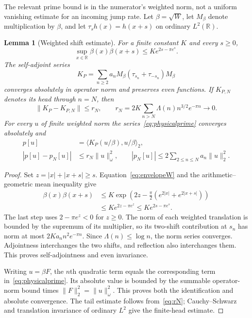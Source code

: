 \documentclass[11pt,a4paper]{article}
\numberwithin{equation}{section}
\newtheorem{lemma}[theorem]{Lemma}
\theoremstyle{definition}
\theoremstyle{remark}
\newcommand{\R}{\mathbb R}
\newcommand{\ip}[2]{\langle #1,#2\rangle}
\newcommand{\norm}[1]{\lVert #1\rVert}
\begin{document}
The relevant prime bound is in the numerator's weighted norm, not a uniform vanishing estimate for an incoming jump rate. Let $\beta=\sqrt W$, let $M_\beta$ denote multiplication by $\beta$, and let $\tau_sh(x)=h(x+s)$ on ordinary $L^2(\R)$.

\begin{lemma}[Weighted shift estimate]\label{lem:prime}
For a finite constant $K$ and every $s\ge0$,
\begin{equation}\label{eq:betaprod}
 \sup_{x\in\R}\beta(x)\beta(x+s)\le K e^{2s-\pi e^s}.
\end{equation}
The self-adjoint series
\begin{equation}\label{eq:KP}
 K_P=\sum_{n\ge2}a_nM_\beta(\tau_{s_n}+\tau_{-s_n})M_\beta
\end{equation}
converges absolutely in operator norm and preserves even functions. If $K_{P,N}$ denotes its head through $n=N$, then
\begin{equation}\label{eq:rN}
 \norm{K_P-K_{P,N}}\le r_N,
 \qquad r_N=2K\sum_{n>N}\Lambda(n)n^{3/2}e^{-\pi n}\longrightarrow0.
\end{equation}
For every $u$ of finite weighted norm the series~\eqref{eq:physicalprime} converges absolutely and
\begin{align}
 p[u]&=\ip{K_P(u/\beta)}{u/\beta}_2,\label{eq:prepresentation}\\
 |p[u]-p_N[u]|&\le r_N\norm{u}_\omega^2,\qquad
 |p_N[u]|\le2\sum_{2\le n\le N}a_n\norm{u}_2^2.\label{eq:headtail}
\end{align}
\end{lemma}
\begin{proof}
Set $z=|x|+|x+s|\ge s$. Equation~\eqref{eq:envelopeW} and the arithmetic--geometric mean inequality give
\begin{align*}
 \beta(x)\beta(x+s)
 &\le K\exp\!\left(2z-\frac\pi2(e^{2|x|}+e^{2|x+s|})\right)\\
 &\le K e^{2z-\pi e^z}\le K e^{2s-\pi e^s}.
\end{align*}
The last step uses $2-\pi e^z<0$ for $z\ge0$. The norm of each weighted translation is bounded by the supremum of its multiplier, so its two-shift contribution at $s_n$ has norm at most $2Ka_nn^2e^{-\pi n}$. Since $\Lambda(n)\le\log n$, the norm series converges. Adjointness interchanges the two shifts, and reflection also interchanges them. This proves self-adjointness and even invariance.

Writing $u=\beta F$, the $n$th quadratic term equals the corresponding term in~\eqref{eq:physicalprime}. Its absolute value is bounded by the summable operator-norm bound times $\norm{F}_2^2=\norm{u}_\omega^2$. This proves both the identification and absolute convergence. The tail estimate follows from~\eqref{eq:rN}; Cauchy--Schwarz and translation invariance of ordinary $L^2$ give the finite-head estimate.
\end{proof}
\end{document}
